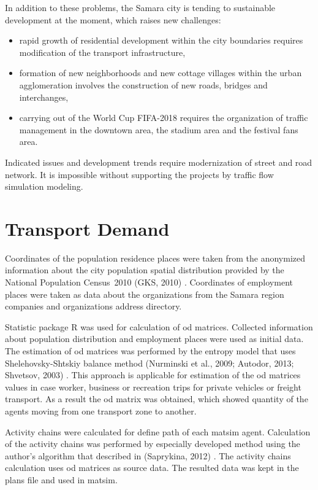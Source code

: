 In addition to these problems, the Samara city is tending to sustainable development at the moment, which raises new challenges:
\begin{itemize}
\item rapid growth of residential development within the city boundaries requires modification of the transport infrastructure,
\item formation of new neighborhoods and new cottage villages within the urban agglomeration involves the construction of new roads, bridges and interchanges,
\item carrying out of the World Cup FIFA-2018 requires the organization of traffic management in the downtown area, the stadium area and the festival fans area.
\end{itemize}

Indicated issues and development trends require modernization of street and road network. It is impossible without supporting the projects by traffic flow simulation modeling.

\section{Transport Demand}
Coordinates of the population residence places were taken from the anonymized information about the city population spatial distribution provided by the National Population Census~2010 (GKS, 2010) \citep[][]{}. Coordinates of employment places were taken as data about the organizations from the Samara region companies and organizations address directory.

Statistic package R was used for calculation of \gls{od} matrices. Collected information about population distribution and employment places were used as initial data. The estimation of \gls{od} matrices was performed by the entropy model that uses Shelehovsky-Shtskiy balance method (Nurminski et al., 2009; Autodor, 2013; Shvetsov, 2003) \citep[][]{}. This approach is applicable for estimation of the \gls{od} matrices values in case worker, business or recreation trips for private vehicles or freight transport. As a result the \gls{od} matrix was obtained, which showed quantity of the agents moving from one transport zone to another.

Activity chains were calculated for define path of each \gls{matsim} agent. Calculation of the activity chains was performed by especially developed method using the author's algorithm that described in (Saprykina, 2012) \citet[][]{}. The activity chains calculation uses \gls{od} matrices as source data. The resulted data was kept in the plans file and used in \gls{matsim}.

